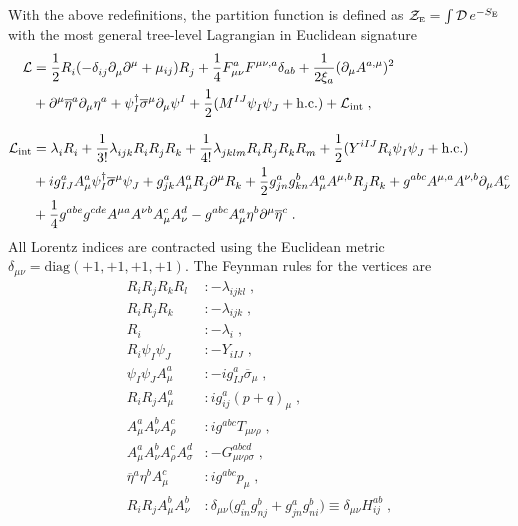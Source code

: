\documentclass[11pt]{article}
\renewcommand{\nn}{\nonumber \\}
\renewcommand{\rmi}[1]{{\mbox{\scriptsize #1}}}
\newcommand{\rmii}[1]{{\mbox{\tiny\rm{#1}}}}
\begin{document}
With the above redefinitions, the partition function is defined as
$\mathcal{Z}_{\rmii{E}} =\int\mathcal{D}\,e^{-S_{\rmii{E}}}$ with
the most general tree-level Lagrangian in
Euclidean signature
\begin{align}
\mathcal{L}&=
   \frac{1}{2} R_{i}^{ }(-\delta_{ij}^{ }\partial_\mu^{ }\partial^\mu + \mu_{ij}) R_{j}^{ }
  + \frac{1}{4}F_{\mu \nu}^a F^{\mu \nu,a}\delta_{ab}
  + \frac{1}{2\xi_a}(\partial_\mu A^{a,\mu})^2
  \nn &
  + \partial^\mu \overline{\eta}^a \partial_\mu \eta^a
  + \psi_{I}^{\dagger}\overline{\sigma}^\mu \mathcal{\partial}_\mu \psi^{I}
  + \frac{1}{2}(M^{IJ}\psi_{I}^{ }\psi_{J}^{ }+\mathrm{h.c.})
  + \mathcal{L}_{\rmi{int}}
  \;,\\[3mm]
\mathcal{L}_{\rmi{int}}&=
    \lambda_{i}^{ }R_{i}^{ }+ \frac{1}{3!}\lambda_{i j k}^{ }R_{i}^{ } R_{j}^{ } R_{k}^{ }
  + \frac{1}{4!}\lambda_{jklm}^{ } R_{i}^{ } R_{j}^{ } R_{k}^{ } R_{m}^{ }
  + \frac{1}{2}(Y^{i I J}R_{i}^{ } \psi_{I}^{ } \psi_{J}^{ } + \mathrm{h.c.})
  \nn &
  + ig_{IJ}^{a}A^a_\mu \psi_{I}^{\dagger}\overline{\sigma}^\mu \psi_{J}^{ }
  + g_{jk}^{a} A^a_\mu  R_{j}^{ } \partial^\mu R_{k}^{ }
  + \frac{1}{2}g^{a}_{j n}g^b_{kn}A_\mu^a A^{\mu,b}R_{j}^{ } R_{k}^{ }
  + g^{abc}A^{\mu,a}A^{\nu,b}\partial_\mu A^c_\nu
  \nn &
  + \frac{1}{4}g^{abe}g^{cde}A^{\mu a}A^{\nu b}A_{\mu}^c A_\nu^d
  - g^{abc}A_\mu^a \eta^b \partial^\mu \overline{\eta}^c
  \;.
\end{align}
All Lorentz indices are contracted using the
Euclidean metric 
$\delta_{\mu\nu}=\mbox{diag}(+1,+1,+1,+1)$.
The Feynman rules for the vertices are
\begin{align}
  R_{i}R_{j}R_{k}R_{l} &:
  -\lambda_{ijkl}
  \;,\\
  R_{i}R_{j}R_{k} &:
  -\lambda_{ijk}
  \;,\\
    R_{i} &:
  -\lambda_{i}
  \;,\\
  R_{i}\psi_{I}\psi_{J} &:
  -Y_{i IJ}
  \;,\\
  \psi_{I}^{ }\psi_{J}^{ }A^a_\mu &:
  -ig^{a}_{IJ} \overline{\sigma}_\mu
  \;,\\
  R_{i}^{ }R_{j}^{ } A^a_\mu &:
  i g_{ij}^a (p+q)_\mu
  \;,\\
  A^a_\mu A^b_\nu A^c_\rho &:
  i g^{abc}T_{\mu\nu\rho}
  \;,\\
  A^a_\mu A^b_\nu A^c_\rho A_\sigma^d &:
  -G_{\mu\nu\rho\sigma}^{abcd}
  \;,\\
  \overline{\eta}^a \eta^b A^c_\mu &:
  ig^{abc}p_\mu
  \;,\\
  \label{eq:RRAA}
  R_{i}^{ }R_{j}^{ } A^b_\mu A^b_\nu &:
 \delta _{\mu \nu}^{ }\bigl(g_{in}^a g_{n j}^b+g_{jn}^a g_{n i}^b\bigr)\equiv \delta_{\mu \nu}H^{ab}_{ij}
  \;,
\end{align}
\end{document}
